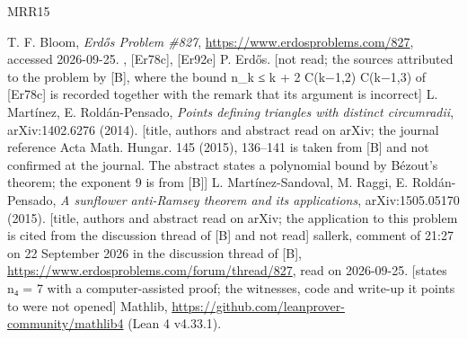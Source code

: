 \documentclass[11pt,a4paper]{article}
\theoremstyle{named}
\begin{document}
\begin{thebibliography}{MRR15}

 T. F. Bloom, \textit{Erdős Problem \#827}, \url{https://www.erdosproblems.com/827}, accessed 2026-09-25.
 , [Er78c], [Er92e] P. Erdős. [not read; the sources attributed to the problem by [B], where the bound n\_k ≤ k + 2 C(k−1,2) C(k−1,3) of [Er78c] is recorded together with the remark that its argument is incorrect]
 L. Martínez, E. Roldán-Pensado, \textit{Points defining triangles with distinct circumradii}, arXiv:1402.6276 (2014). [title, authors and abstract read on arXiv; the journal reference Acta Math. Hungar. 145 (2015), 136–141 is taken from [B] and not confirmed at the journal. The abstract states a polynomial bound by Bézout's theorem; the exponent 9 is from [B]]
 L. Martínez-Sandoval, M. Raggi, E. Roldán-Pensado, \textit{A sunflower anti-Ramsey theorem and its applications}, arXiv:1505.05170 (2015). [title, authors and abstract read on arXiv; the application to this problem is cited from the discussion thread of [B] and not read]
 sallerk, comment of 21:27 on 22 September 2026 in the discussion thread of [B], \url{https://www.erdosproblems.com/forum/thread/827}, read on 2026-09-25. [states n₄ = 7 with a computer-assisted proof; the witnesses, code and write-up it points to were not opened]
 Mathlib, \url{https://github.com/leanprover-community/mathlib4} (Lean 4 v4.33.1).

\end{thebibliography}
\end{document}
